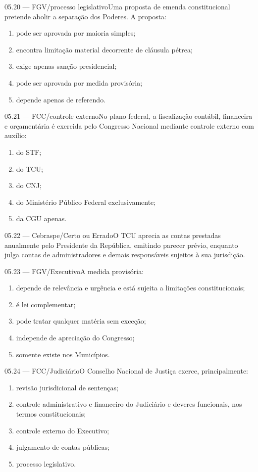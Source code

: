 \begin{questao}{ 05.20 — FGV/processo legislativo}Uma proposta de emenda constitucional pretende abolir a separação dos Poderes. A proposta:\begin{enumerate}[label=\Alph*)]\item pode ser aprovada por maioria simples;\item encontra limitação material decorrente de cláusula pétrea;\item exige apenas sanção presidencial;\item pode ser aprovada por medida provisória;\item depende apenas de referendo.\end{enumerate}\end{questao}
\begin{questao}{ 05.21 — FCC/controle externo}No plano federal, a fiscalização contábil, financeira e orçamentária é exercida pelo Congresso Nacional mediante controle externo com auxílio:\begin{enumerate}[label=\Alph*)]\item do STF;\item do TCU;\item do CNJ;\item do Ministério Público Federal exclusivamente;\item da CGU apenas.\end{enumerate}\end{questao}
\begin{questao}{ 05.22 — Cebraspe/Certo ou Errado}O TCU aprecia as contas prestadas anualmente pelo Presidente da República, emitindo parecer prévio, enquanto julga contas de administradores e demais responsáveis sujeitos à sua jurisdição.\end{questao}
\begin{questao}{ 05.23 — FGV/Executivo}A medida provisória:\begin{enumerate}[label=\Alph*)]\item depende de relevância e urgência e está sujeita a limitações constitucionais;\item é lei complementar;\item pode tratar qualquer matéria sem exceção;\item independe de apreciação do Congresso;\item somente existe nos Municípios.\end{enumerate}\end{questao}
\begin{questao}{ 05.24 — FCC/Judiciário}O Conselho Nacional de Justiça exerce, principalmente:\begin{enumerate}[label=\Alph*)]\item revisão jurisdicional de sentenças;\item controle administrativo e financeiro do Judiciário e deveres funcionais, nos termos constitucionais;\item controle externo do Executivo;\item julgamento de contas públicas;\item processo legislativo.\end{enumerate}\end{questao}
